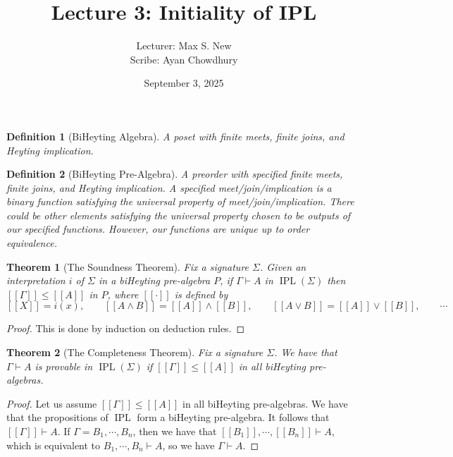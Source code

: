 \documentclass[12pt]{article}
\newtheorem{theorem}{Theorem}
\newtheorem{definition}{Definition}
\DeclareMathOperator{\IPL}{IPL}
\begin{document}
\title{Lecture 3: Initiality of IPL}
\author{Lecturer: Max S. New\\ Scribe: Ayan Chowdhury}
\date{September 3, 2025}
\maketitle

\begin{definition}[BiHeyting Algebra]
    A poset with finite meets, finite joins, and Heyting implication.
\end{definition}

\begin{definition}[BiHeyting Pre-Algebra]
    A preorder with specified finite meets, finite joins, and Heyting implication. A specified meet/join/implication is a binary function satisfying the universal property of meet/join/implication. There could be other elements satisfying the universal property chosen to be outputs of our specified functions. However, our functions are unique up to order equivalence.
\end{definition}

\begin{theorem}[The Soundness Theorem]
    Fix a signature $\Sigma$. Given an interpretation $i$ of $\Sigma$ in a biHeyting pre-algebra $P$, if $\Gamma \vdash A$ in $\IPL(\Sigma)$ then $[[\Gamma]] \le [[A]]$ in $P$, where $[[\cdot]]$ is defined by 
    \[
        [[X]] = i(x), \quad\quad [[A \land B]] = [[A]] \land [[B]], \quad\quad [[A \lor B]] = [[A]] \lor [[B]], \quad\quad \cdots
    \]
\end{theorem}
\begin{proof}
    This is done by induction on deduction rules. 
\end{proof}

\begin{theorem}[The Completeness Theorem]
    Fix a signature $\Sigma$. We have that $\Gamma \vdash A$ is provable in $\IPL(\Sigma)$ if $[[\Gamma]] \le [[A]]$ in all biHeyting pre-algebras.
\end{theorem}
\begin{proof}
    Let us assume $[[\Gamma]] \le [[A]]$ in all biHeyting pre-algebras. We have that the propositions of $\IPL$ form a biHeyting pre-algebra. It follows that $[[\Gamma]] \vdash A$. If $\Gamma = B_1, \cdots, B_n$, then we have that $[[B_1]], \cdots, [[B_n]] \vdash A$, which is equivalent to $B_1, \cdots, B_n \vdash A$, so we have $\Gamma \vdash A$.
\end{proof}
\end{document}
